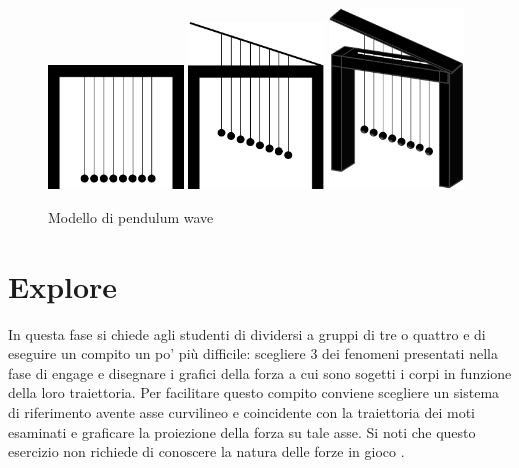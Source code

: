 \documentclass{article}
\begin{document}
\begin{figure}
\centering
  \includegraphics[width=0.32\textwidth]{image3}
  \includegraphics[width=0.32\textwidth]{image2}
  \includegraphics[width=0.32\textwidth]{image1}
  \caption{Modello di pendulum wave}
  \label{fig:pendulum_wave}
\end{figure}

\section{Explore}
In questa fase si chiede agli studenti di dividersi a gruppi di tre
o quattro e di eseguire un compito un po' più difficile: scegliere
3 dei fenomeni presentati nella fase di engage e disegnare i
grafici della forza a cui sono sogetti i corpi in funzione della
loro traiettoria. Per facilitare questo compito conviene
scegliere un sistema di riferimento avente asse curvilineo
e coincidente con la traiettoria dei moti esaminati e graficare
la proiezione della forza su tale asse. Si noti che questo
esercizio non richiede di conoscere la natura delle forze in
gioco \cite{barbieri2015good}.
\end{document}
